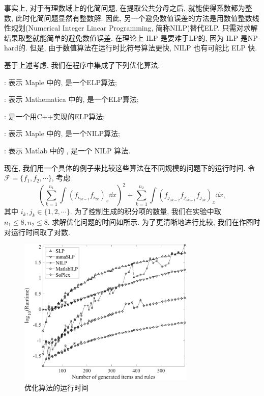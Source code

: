 事实上, 对于有理数域上的化简问题, 在提取公共分母之后, 就能使得系数都为整数, 此时化简问题显然有整数解. 因此, 另一个避免数值误差的方法是用数值整数线性规划(Numerical Integer Linear Programming, 简称NILP)替代ELP. 只需对求解结果取整就能简单的避免数值误差. 在理论上 ILP 是要难于LP的, 因为 ILP 是NP-hard的. 但是, 由于数值算法在运行时比符号算法更快, NILP 也有可能比 ELP 快. 

基于上述考虑, 我们在程序中集成了下列优化算法: 
\begin{compactitem}[\textbullet]
\item {}: 表示 Maple 中的, 是一个ELP算法; 
\item {}: 表示 Mathematica 中的, 是一个ELP算法;
\item {}\cite{soplex}: 是一个用C++实现的ELP算法;
\item {}: 表示 Maple 中的, 是一个NILP算法;
\item {}: 表示 Matlab 中的  , 是一个 NILP 算法.
\end{compactitem}

现在, 我们用一个具体的例子来比较这些算法在不同规模的问题下的运行时间. 令$\mathcal F=\{f_1,f_2,\cdots\}$, 考虑
\begin{equation}
\left(\sum\limits_{k=1}^{n_1}{\int\!{(f_{i_{2k-1}}f_{i_{2k}})_x\dd x}}\right)^2+\sum\limits_{k=1}^{n_2}{\int\!{(f_{j_{3k-2}}f_{j_{3k-1}}f_{j_{3k}})_x\dd x}},
\end{equation}
其中 $i_k,j_k \in \{1,2,\cdots\}$. 为了控制生成的积分项的数量, 我们在实验中取$n_1\le 8,n_2\le 8$. 求解优化问题的时间如所示. 为了更清晰地进行比较, 我们在作图时对运行时间取了对数. 

\begin{figure}[htbp]
\centering
\includegraphics[width=0.75\textwidth]{fig/int-6.pdf}
\caption{优化算法的运行时间}\label{opts_log}
\label{opts_all}
\end{figure}


